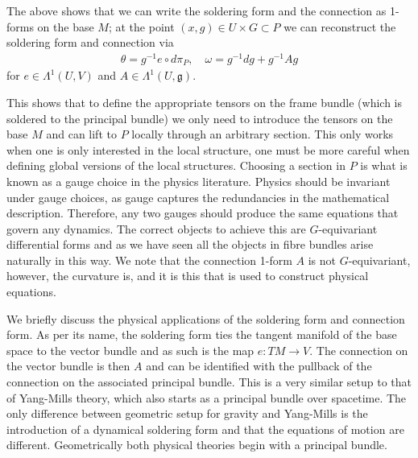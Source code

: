 \documentclass[10pt]{report}
\theoremstyle{definition}
\begin{document}
The above shows that we can write the soldering form and the connection as 1-forms on the base $M$; at the point $(x,g) \in U \times G \subset P$ we can reconstruct the soldering form and connection via
\begin{align}
    \theta = g^{-1} e \circ d\pi_P, \quad \omega = g^{-1} dg + g^{-1} A g
\end{align}
for $e \in \Lambda^1(U,V)$ and $A \in \Lambda^1(U,\mathfrak{g})$.

This shows that to define the appropriate tensors on the frame bundle (which is soldered to the principal bundle) we only need to introduce the tensors on the base $M$ and can lift to $P$ locally through an arbitrary section. This only works when one is only interested in the local structure, one must be more careful when defining global versions of the local structures. Choosing a section in $P$ is what is known as a gauge choice in the physics literature. Physics should be invariant under gauge choices, as gauge captures the redundancies in the mathematical description. Therefore, any two gauges should produce the same equations that govern any dynamics. The correct objects to achieve this are $G$-equivariant differential forms and as we have seen all the objects in fibre bundles arise naturally in this way. We note that the connection 1-form $A$ is not $G$-equivariant, however, the curvature is, and it is this that is used to construct physical equations.

We briefly discuss the physical applications of the soldering form and connection form. As per its name, the soldering form ties the tangent manifold of the base space to the vector bundle and as such is the map $e : TM \rightarrow V$. The connection on the vector bundle is then $A$ and can be identified with the pullback of the connection on the associated principal bundle. This is a very similar setup to that of Yang-Mills theory, which also starts as a principal bundle over spacetime. The only difference between geometric setup for gravity and Yang-Mills is the introduction of a dynamical soldering form and that the equations of motion are different. Geometrically both physical theories begin with a principal bundle.
\end{document}
